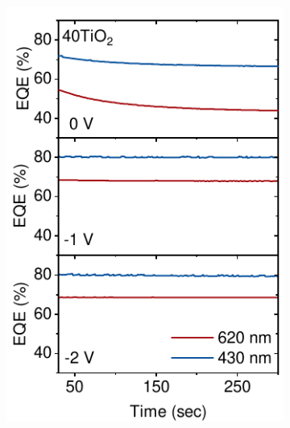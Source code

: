 \begin{figure}[htbp]
\begin{subfigure}{0.32\textwidth}
        \includegraphics[width=\textwidth]{chapters/transport_layers/images/StaticEQE_40TiO2.pdf}
        \caption{}
        \label{}
    \end{subfigure}
    \hfill
    \begin{subfigure}{0.32\textwidth}
        \centering

\end{subfigure}
\end{figure}
